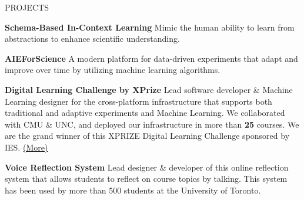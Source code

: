 \documentclass{resume} %
\begin{document}
\begin{rSection}{PROJECTS}
\vspace{-1.25em}
\item \textbf{Schema-Based In-Context Learning} {Mimic the human ability to learn from abstractions to enhance scientific understanding.}
\item \textbf{AIEForScience} {A modern platform for data-driven experiments that adapt and improve over time by utilizing machine learning algorithms.}

\item \textbf{Digital Learning Challenge by XPrize} {Lead software developer \& Machine Learning designer for the cross-platform infrastructure that supports both traditional and adaptive experiments and Machine Learning. We collaborated with CMU \& UNC, and deployed our infrastructure in more than \textbf{25} courses. We are the grand winner of this XPRIZE Digital Learning Challenge sponsored by IES. \href{https://www.xprize.org/challenge/digitallearning/finalist-teams}{(More)}}

\item \textbf{Voice Reflection System} {Lead designer \& developer of this online reflection system that allows students to reflect on course topics by talking. This system has been used by more than 500 students at the University of Toronto.}

\end{rSection} 

    
\end{document}
